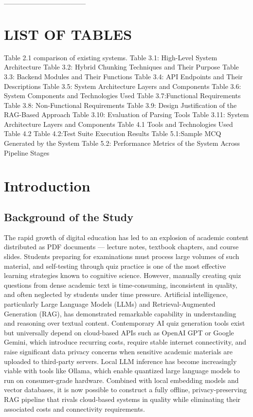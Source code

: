 \documentclass[12pt,a4paper]{report}
\begin{document}
\_\_\_\_\_\_\_\_\_\_\_\_\_\_\_\_


\chapter*{LIST OF TABLES}


Table 2.1  comparison of existing systems.
Table 3.1: High-Level System Architecture
Table 3.2: Hybrid Chunking Techniques and Their Purpose
Table 3.3: Backend Modules and Their Functions
Table 3.4: API Endpoints and Their Descriptions
Table 3.5: System Architecture Layers and Components
Table 3.6: System Components and Technologies Used
Table 3.7:Functional Requirements
Table 3.8: Non-Functional Requirements
Table 3.9: Design Justification of the RAG-Based Approach
Table 3.10: Evaluation of Parsing Tools
Table 3.11: System Architecture Layers and Components
Table 4.1  Tools and Technologies Used
Table 4.2  Table 4.2:Test Suite Execution Results
Table 5.1:Sample MCQ Generated by the System
Table 5.2: Performance Metrics of the System Across Pipeline Stages














\tableofcontents
\newpage
\chapter{Introduction}
\section{Background of the Study}
The rapid growth of digital education has led to an explosion of academic content distributed as PDF documents — lecture notes, textbook chapters, and course slides. Students preparing for examinations must process large volumes of such material, and self-testing through quiz practice is one of the most effective learning strategies known to cognitive science. However, manually creating quiz questions from dense academic text is time-consuming, inconsistent in quality, and often neglected by students under time pressure.
Artificial intelligence, particularly Large Language Models (LLMs) and Retrieval-Augmented Generation (RAG), has demonstrated remarkable capability in understanding and reasoning over textual content. Contemporary AI quiz generation tools exist but universally depend on cloud-based APIs such as OpenAI GPT or Google Gemini, which introduce recurring costs, require stable internet connectivity, and raise significant data privacy concerns when sensitive academic materials are uploaded to third-party servers.
Local LLM inference has become increasingly viable with tools like Ollama, which enable quantized large language models to run on consumer-grade hardware. Combined with local embedding models and vector databases, it is now possible to construct a fully offline, privacy-preserving RAG pipeline that rivals cloud-based systems in quality while eliminating their associated costs and connectivity requirements.
\end{document}
